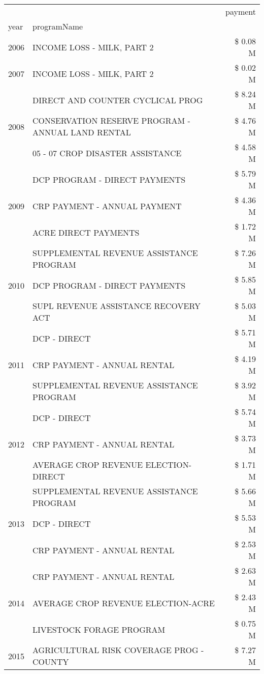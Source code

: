 \begin{tabular}{llr}
\toprule
 &  & payment \\
year & programName &  \\
\midrule
2006 & INCOME LOSS - MILK, PART 2 & \$ 0.08 M \\
\cline{1-3}
2007 & INCOME LOSS - MILK, PART 2 & \$ 0.02 M \\
\cline{1-3}
\multirow[t]{3}{*}{2008} & DIRECT AND COUNTER CYCLICAL PROG & \$ 8.24 M \\
 & CONSERVATION RESERVE PROGRAM - ANNUAL LAND RENTAL & \$ 4.76 M \\
 & 05 - 07 CROP DISASTER ASSISTANCE & \$ 4.58 M \\
\cline{1-3}
\multirow[t]{3}{*}{2009} & DCP PROGRAM - DIRECT PAYMENTS & \$ 5.79 M \\
 & CRP PAYMENT - ANNUAL PAYMENT & \$ 4.36 M \\
 & ACRE DIRECT PAYMENTS & \$ 1.72 M \\
\cline{1-3}
\multirow[t]{3}{*}{2010} & SUPPLEMENTAL REVENUE ASSISTANCE PROGRAM & \$ 7.26 M \\
 & DCP PROGRAM - DIRECT PAYMENTS & \$ 5.85 M \\
 & SUPL REVENUE ASSISTANCE RECOVERY ACT & \$ 5.03 M \\
\cline{1-3}
\multirow[t]{3}{*}{2011} & DCP - DIRECT & \$ 5.71 M \\
 & CRP PAYMENT - ANNUAL RENTAL & \$ 4.19 M \\
 & SUPPLEMENTAL REVENUE ASSISTANCE PROGRAM & \$ 3.92 M \\
\cline{1-3}
\multirow[t]{3}{*}{2012} & DCP - DIRECT & \$ 5.74 M \\
 & CRP PAYMENT - ANNUAL RENTAL & \$ 3.73 M \\
 & AVERAGE CROP REVENUE ELECTION-DIRECT & \$ 1.71 M \\
\cline{1-3}
\multirow[t]{3}{*}{2013} & SUPPLEMENTAL REVENUE ASSISTANCE PROGRAM & \$ 5.66 M \\
 & DCP - DIRECT & \$ 5.53 M \\
 & CRP PAYMENT - ANNUAL RENTAL & \$ 2.53 M \\
\cline{1-3}
\multirow[t]{3}{*}{2014} & CRP PAYMENT - ANNUAL RENTAL & \$ 2.63 M \\
 & AVERAGE CROP REVENUE ELECTION-ACRE & \$ 2.43 M \\
 & LIVESTOCK FORAGE PROGRAM & \$ 0.75 M \\
\cline{1-3}
\multirow[t]{3}{*}{2015} & AGRICULTURAL RISK COVERAGE PROG - COUNTY & \$ 7.27 M \\

\end{tabular}
